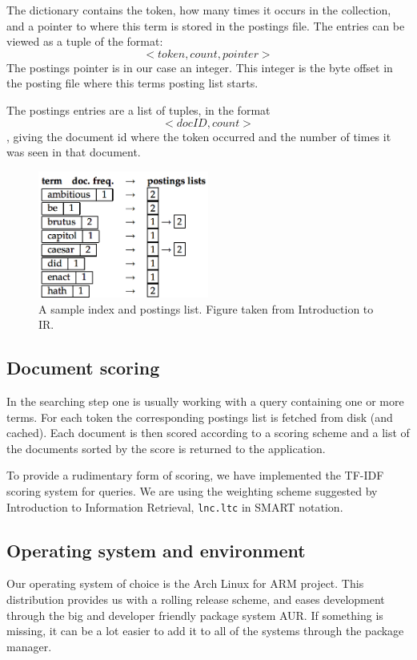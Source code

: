The dictionary contains the token, how many times it occurs in the collection, and a pointer to where this term is stored in the postings file.
The entries can be viewed as a tuple of the format:
$$<token, count, pointer>$$
The postings pointer is in our case an integer. This integer is the byte offset in the posting file where this terms posting list starts.

The postings entries are a list of tuples, in the format $$<docID, count>$$, giving the document id where the token occurred and the number of times it was seen in that document.

\begin{figure}[h]
    \center
    \includegraphics[width=0.5\textwidth]{software/index_postings_lists}
    \caption{A sample index and postings list. Figure taken from Introduction to IR\cite{IntroIR}.}
    \label{fig:index_postings_lists_sw}
\end{figure}

\subsection{Document scoring}
In the searching step one is usually working with a query containing one or more terms. For each token the corresponding postings list is fetched from disk (and cached). Each document is then scored according to a scoring scheme and a list of the documents sorted by the score is returned to the application.

To provide a rudimentary form of scoring, we have implemented the TF-IDF scoring system for queries. We are using the weighting scheme suggested by Introduction to Information Retrieval\cite{IntroIR}, {\tt lnc.ltc} in SMART notation\cite{tfidfsmart}.


\subsection{Operating system and environment}
Our operating system of choice is the Arch Linux for ARM project\cite{archarm}. This distribution provides us with a rolling release scheme, and eases development through the big and developer friendly package system AUR. If something is missing, it can be a lot easier to add it to all of the systems through the package manager.


